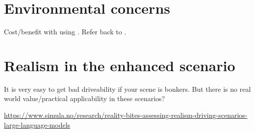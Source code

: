 \documentclass[UKenglish]{uiomasterthesis}  %
\begin{document}
\section{Environmental concerns}
Cost/benefit with using . Refer back to .

\section{Realism in the enhanced scenario}

It is very easy to get bad driveability if your scene is bonkers. But there is no real world
value/practical applicability in these scenarios?

\url{https://www.simula.no/research/reality-bites-assessing-realism-driving-scenarios-large-language-models}



\backmatter{}
\printbibliography{}
\printglossaries{}
\end{document}
